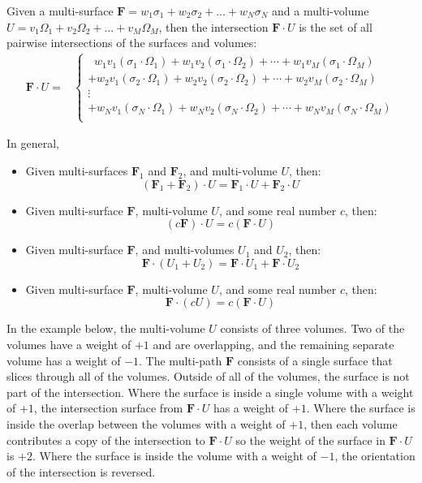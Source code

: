 \documentclass{book}
\begin{document}
Given a multi-surface \(\mathbf{F} = w_1\sigma_1 + w_2\sigma_2 + ... + w_N\sigma_N\) and a multi-volume \\ \(U = v_1\Omega_1 + v_2\Omega_2 + ... + v_M\Omega_M\), then the intersection \(\mathbf{F} \cdot U\) is the set of all pairwise intersections of the surfaces and volumes:
\begin{align*}
\mathbf{F} \cdot U = & \left\{\begin{array}{c}
\;\; w_1 v_1 (\sigma_1 \cdot \Omega_1) + w_1 v_2 (\sigma_1 \cdot \Omega_2) + \cdots + w_1 v_M (\sigma_1 \cdot \Omega_M) \\ 
+ w_2 v_1 (\sigma_2 \cdot \Omega_1) + w_2 v_2 (\sigma_2 \cdot \Omega_2) + \cdots + w_2 v_M (\sigma_2 \cdot \Omega_M) \\ 
\vdots \\
+ w_N v_1 (\sigma_N \cdot \Omega_1) + w_N v_2 (\sigma_N \cdot \Omega_2) + \cdots + w_N v_M (\sigma_N \cdot \Omega_M) \\ 
\end{array}\right.
\end{align*}

In general,
\begin{itemize}
\item Given multi-surfaces \(\mathbf{F}_1\) and \(\mathbf{F}_2\), and multi-volume \(U\), then:
\[(\mathbf{F}_1 + \mathbf{F}_2) \cdot U = \mathbf{F}_1 \cdot U + \mathbf{F}_2 \cdot U\] 
\item Given multi-surface \(\mathbf{F}\), multi-volume \(U\), and some real number \(c\), then:
\[(c\mathbf{F}) \cdot U = c(\mathbf{F} \cdot U)\]
\item Given multi-surface \(\mathbf{F}\), and multi-volumes \(U_1\) and \(U_2\), then:
\[\mathbf{F} \cdot (U_1 + U_2) = \mathbf{F} \cdot U_1 + \mathbf{F} \cdot U_2\] 
\item Given multi-surface \(\mathbf{F}\), multi-volume \(U\), and some real number \(c\), then:
\[\mathbf{F} \cdot (cU) = c(\mathbf{F} \cdot U)\]
\end{itemize}

In the example below, the multi-volume \(U\) consists of three volumes. Two of the volumes have a weight of \(+1\) and are overlapping, and the remaining separate volume has a weight of \(-1\). The multi-path \(\mathbf{F}\) consists of a single surface that slices through all of the volumes. Outside of all of the volumes, the surface is not part of the intersection. Where the surface is inside a single volume with a weight of \(+1\), the intersection surface from \(\mathbf{F} \cdot U\) has a weight of \(+1\). Where the surface is inside the overlap between the volumes with a weight of \(+1\), then each volume contributes a copy of the intersection to \(\mathbf{F} \cdot U\) so the weight of the surface in \(\mathbf{F} \cdot U\) is \(+2\). Where the surface is inside the volume with a weight of \(-1\), the orientation of the intersection is reversed.  
\end{document}
